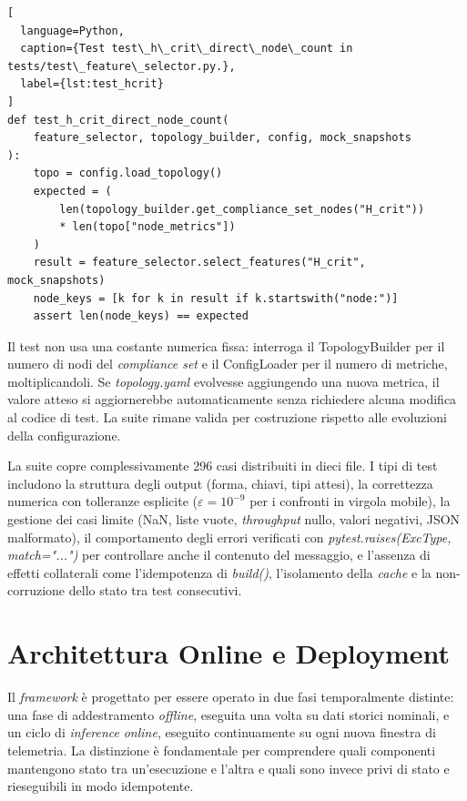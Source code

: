 \begin{lstlisting}[
  language=Python,
  caption={Test test\_h\_crit\_direct\_node\_count in tests/test\_feature\_selector.py.},
  label={lst:test_hcrit}
]
def test_h_crit_direct_node_count(
    feature_selector, topology_builder, config, mock_snapshots
):
    topo = config.load_topology()
    expected = (
        len(topology_builder.get_compliance_set_nodes("H_crit"))
        * len(topo["node_metrics"])
    )
    result = feature_selector.select_features("H_crit", mock_snapshots)
    node_keys = [k for k in result if k.startswith("node:")]
    assert len(node_keys) == expected
\end{lstlisting}

Il test non usa una costante numerica fissa: interroga il TopologyBuilder
per il numero di nodi del \textit{compliance set} e il ConfigLoader per il numero di metriche,
moltiplicandoli. Se \textit{topology.yaml} evolvesse aggiungendo una nuova metrica, il valore atteso si
aggiornerebbe automaticamente senza richiedere alcuna modifica al codice di test. La suite
rimane valida per costruzione rispetto alle evoluzioni della configurazione.

La suite copre complessivamente 296 casi distribuiti in dieci file. I tipi di test
includono la struttura degli output (forma, chiavi, tipi attesi), la correttezza numerica con
tolleranze esplicite ($\varepsilon = 10^{-9}$ per i confronti in virgola mobile), la gestione dei
casi limite (NaN, liste vuote, \textit{throughput} nullo, valori negativi, JSON malformato), il
comportamento degli errori verificati con \textit{pytest.raises(ExcType, match="...")} per
controllare anche il contenuto del messaggio, e l'assenza di effetti collaterali come
l'idempotenza di \textit{build()}, l'isolamento della \textit{cache} e la non-corruzione dello
stato tra test consecutivi.

\section{Architettura Online e Deployment}
\label{sec:architettura_online}

Il \textit{framework} è progettato per essere operato in due fasi temporalmente distinte: una
fase di addestramento \textit{offline}, eseguita una volta su dati storici nominali, e un ciclo
di \textit{inference} \textit{online}, eseguito continuamente su ogni nuova finestra di
telemetria. La distinzione è fondamentale per comprendere quali componenti mantengono stato
tra un'esecuzione e l'altra e quali sono invece privi di stato e rieseguibili in modo
idempotente.

